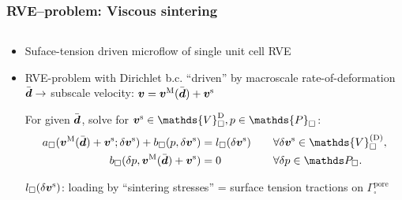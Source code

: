 \documentclass[11pt,mathserif]{beamer}
\begin{document}
\newcommand{\macroscale}{\mathrm{M}}
\newcommand{\subscale}{\mathrm{s}}
\begin{frame}
 \frametitle{RVE--problem: Viscous sintering}
 \begin{center}
  \begin{columns}
   \centering
    \resizebox{!}{0.8\textwidth}{}
   \centering
    \resizebox{!}{0.8\textwidth}{}
  \end{columns}
 \end{center}
 \begin{itemize}
  \item Suface-tension driven microflow of single unit cell RVE
  \item RVE-problem with Dirichlet b.c. ``driven'' by macroscale rate-of-deformation $\bar{\text{\boldmath $d$}}\rightarrow$ subscale velocity:
	$\ts v = \ts v^\macroscale(\bar{\ts d})+\ts v^\subscale$

 For given $\bar{\text{\boldmath $d$}}$, solve for $\ts v^\subscale \in \mathds{V}_\square^{\mathrm{D}}, p \in \mathds{P}_\square$:
 \begin{align*}
  a_\square(\ts v^\macroscale(\bar{\ts d})+\ts v^\subscale; \delta\ts v^\subscale) + b_\square(p,\delta \ts v^\subscale) &= l_\square(\delta \ts v^\subscale)\quad &&\forall \delta \ts v^\subscale \in \mathds{V}_\square^{(\mathrm{D})},\\
 b_\square(\delta p,\ts v^\macroscale(\bar{\ts d}) + \ts v^\subscale) &= 0 && \forall \delta p\in \mathds P_\square.
 \end{align*}

 $l_\square(\delta \ts v^\subscale)$: loading by ``sintering stresses'' = surface tension tractions on $\Gamma_\square^{\text{pore}}$
 \end{itemize}


\end{frame}
\end{document}
